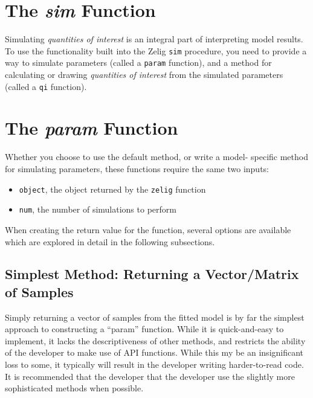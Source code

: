 \documentclass[11pt]{article}
\begin{document}
\section{The \emph{sim} Function}

Simulating \emph{quantities of interest} is an integral part of interpreting model results. To use the functionality built into the Zelig {\tt sim} procedure, you need to provide a way to simulate parameters (called a {\tt param} function), and a method for calculating or drawing \emph{quantities of interest} from the simulated parameters (called a {\tt qi} function).


\section{The \emph{param} Function}
Whether you choose to use the default method, or write a model- specific method for simulating parameters, these functions require the same two inputs:

\begin{itemize}
	\item{{\tt object}, the object returned by the {\tt zelig} function}
	\item{{\tt num}, the number of simulations to perform}
\end{itemize}

When creating the return value for the function, several options are available which are explored in detail in the following subsections.

\subsection{Simplest Method: Returning a Vector/Matrix of Samples}

Simply returning a vector of samples from the fitted model is by far the simplest approach to constructing a ``param'' function.  While it is quick-and-easy to implement, it lacks the descriptiveness of other methods, and restricts the ability of the developer to make use of API functions.  While this my be an insignificant loss to some, it typically will result in the developer writing harder-to-read code.  It is recommended that the developer that the developer use the slightly more sophisticated methods when possible.
\end{document}
